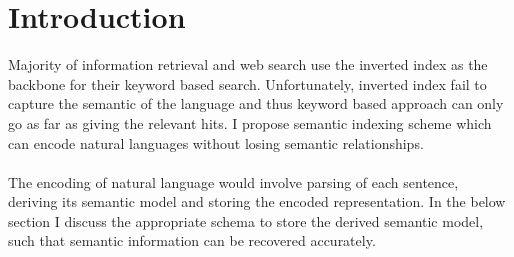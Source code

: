 \documentclass[10pt]{article}
\begin{document}
 

\section{Introduction}
Majority of information retrieval and web search use the inverted index as the backbone for their keyword based search. Unfortunately, inverted index fail to capture the semantic of the language and thus keyword based approach can only go as far as giving the relevant hits. I propose semantic indexing scheme which can encode natural languages without losing semantic relationships.
 \\
 \\
The encoding of natural language would involve parsing of each sentence, deriving its semantic model and storing the encoded representation. In the below section I discuss the appropriate schema to store the derived semantic model, such that semantic information can be recovered accurately. 
\end{document}
